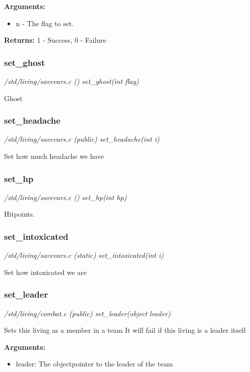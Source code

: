 {\bf Arguments:}
\begin{itemize}
\item      n - The flag to set.
\end{itemize}

{\bf Returns:}        1 - Success, 0 - Failure


\subsubsection{set\_ghost}

{\em /std/living/savevars.c () set\_ghost(int flag)}

Ghost


\subsubsection{set\_headache}

{\em /std/living/savevars.c (public) set\_headache(int i)}

Set how much headache we have


\subsubsection{set\_hp}

{\em /std/living/savevars.c () set\_hp(int hp)}

Hitpoints.


\subsubsection{set\_intoxicated}

{\em /std/living/savevars.c (static) set\_intoxicated(int i)}

Set how intoxicated we are


\subsubsection{set\_leader}

{\em /std/living/combat.c (public) set\_leader(object leader)}

Sets this living as a member in a team
It will fail if this living is a leader itself

{\bf Arguments:}
\begin{itemize}
\item     leader: The objectpointer to the leader of the team
\end{itemize}

